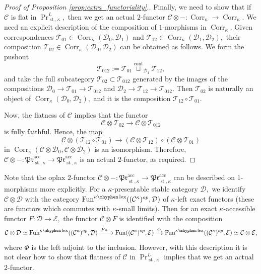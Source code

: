\documentclass[11pt,leqno]{amsart}
\numberwithin{equation}{section}
\newcommand{\hy}{\mhyphen}
\newcommand{\xto}{\xrightarrow}
\newcommand{\Corr}{\operatorname{Corr}}
\newcommand{\cont}{\operatorname{cont}}
\newcommand{\lex}{\operatorname{lex}}
\newcommand{\acc}{\operatorname{acc}}
\newcommand{\st}{\operatorname{st}}
\newcommand{\cD}{{\mathcal D}}
\newcommand{\cC}{{\mathcal C}}
\newcommand{\cE}{{\mathcal E}}
\newcommand{\cT}{{\mathcal T}}
\newcommand{\Fun}{\operatorname{Fun}}
\newcommand{\mPr}{\mathfrak{Pr}}
\begin{document}
\begin{proof}[Proof of Proposition \ref{prop:extra_functoriality}.]
Finally, we need to show that if $\cC$ is flat in $\Pr^L_{\st,\kappa},$ then we get an actual $2$-functor $\cC\otimes-:\Corr_{\kappa}\to\Corr_{\kappa}.$ We need an explicit description of the composition of $1$-morphisms in $\Corr_{\kappa}.$ Given correspondences $\cT_{01}\in\Corr_{\kappa}(\cD_0,\cD_1)$ and $\cT_{12}\in\Corr_{\kappa}(\cD_1,\cD_2),$ their composition $\cT_{02}\in\Corr_{\kappa}(\cD_0,\cD_2)$ can be obtained as follows. We form the pushout $$\cT_{012}:=\cT_{01}\stackrel{\cont}{\sqcup}_{\cD_1}\cT_{12},$$ and take the full subcategory $\cT_{02}\subset \cT_{012}$ generated by the images of the compositions $\cD_0\to\cT_{01}\to \cT_{012}$ and $\cD_2\to\cT_{12}\to\cT_{012}.$ Then $\cT_{02}$ is naturally an object of $\Corr_{\kappa}(\cD_0,\cD_2),$ and it is the composition $\cT_{12}\circ\cT_{01}.$

Now, the flatness of $\cC$ implies that the functor
$$\cC\otimes \cT_{02}\to\cC\otimes\cT_{012}$$
is fully faithful. Hence, the map
\begin{equation*}\label{eq:oplax_structure}\cC\otimes (\cT_{12}\circ\cT_{01})\to (\cC\otimes\cT_{12})\circ(\cC\otimes\cT_{01})\end{equation*} in $\Corr_{\kappa}(\cC\otimes\cD_0,\cC\otimes\cD_2)$ is an isomorphism. Therefore, $\cC\otimes-:\mPr^{\acc}_{\st,\kappa}\to\mPr^{\acc}_{\st,\kappa}$ is an actual $2$-functor, as required.
\end{proof}

Note that the oplax $2$-functor $\cC\otimes-:\mPr^{\acc}_{\st,\kappa}\to \mPr^{\acc}_{\st,\kappa}$ can be described on $1$-morphisms more explicitly. For a $\kappa$-presentable stable category $\cD,$ we identify $\cC\otimes\cD$ with the category $\Fun^{\kappa\hy\lex}((\cC^{\kappa})^{op},\cD)$ of $\kappa$-left exact functors (these are functors which commutes with $\kappa$-small limits). Then for an exact $\kappa$-accessible functor $F:\cD\to\cE,$ the functor $\cC\otimes F$ is identified with the composition
$$\cC\otimes\cD\simeq \Fun^{\kappa\hy\lex}((\cC^{\kappa})^{op},\cD)\xto{F\circ-}\Fun((\cC^{\kappa})^{op},\cE)\xto{\Phi} \Fun^{\kappa\hy\lex}((\cC^{\kappa})^{op},\cE)\simeq \cC\otimes\cE,$$
where $\Phi$ is the left adjoint to the inclusion. However, with this description it is not clear how to show that flatness of $\cC$ in $\Pr^L_{\st,\kappa}$ implies that we get an actual $2$-functor.
\end{document}
